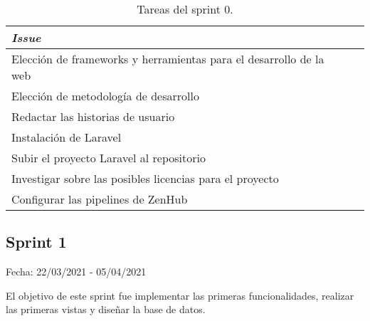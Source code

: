 \begin{table}[H]
	 \begin{tabularx}{\linewidth}{X r r}
	 	\toprule \textbf{\textit{Issue}} \\
	 	\toprule
	 	Elección de frameworks y herramientas para el desarrollo de la web  \\
	 	Elección de metodología de desarrollo \\
	 	Redactar las historias de usuario \\
	 	Instalación de Laravel  \\
	 	Subir el proyecto Laravel al repositorio  \\
	 	Investigar sobre las posibles licencias para el proyecto  \\
	 	Configurar las pipelines de ZenHub  \\
	 	\bottomrule
	 \end{tabularx}
	 \caption{Tareas del sprint 0.}
\end{table}

\subsection{Sprint 1}

Fecha: 22/03/2021 - 05/04/2021

El objetivo de este sprint fue implementar las primeras funcionalidades, realizar las primeras vistas y diseñar la base de datos.


